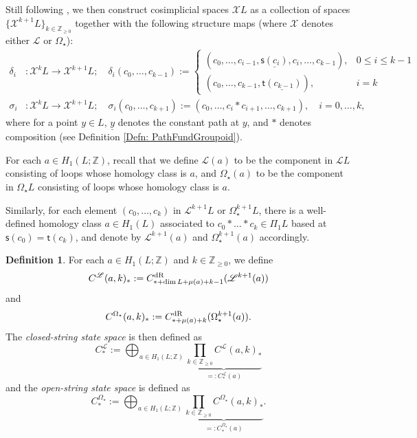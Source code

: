 \documentclass[10pt]{amsart}
\numberwithin{equation}{section}
\theoremstyle{plain}
\theoremstyle{definition}
\newtheorem{definition}[theorem]{Definition}
\theoremstyle{remark}
\numberwithin{equation}{section}
\newcommand{\Z}{\mathbb{Z}}
\newcommand{\mc}[1]{\mathcal{#1}}
\newcommand{\dR}{\textup{dR}}
\newcommand{\CFr}{C_*^\mathscr{L}}
\newcommand{\CBa}{C_*^{\Omega_\star}}
\begin{document}
{\bigskip

Still following \cite{WangThesis},
we then construct cosimplicial spaces $\mc{X}L$ as a collection of spaces $\{\mc{X}^{k+1} L\}_{k\in \Z_{\geq 0}}$ together with the following structure maps (where $\mathcal{X}$ denotes either $\mathscr{L}$ or $\Omega_\star$):
\begin{align*}
	\delta_i &\colon \mathcal{X}^{k}L\to \mathcal{X}^{k+1} L; \quad \delta_i(c_0,\dots, c_{k-1}):= \begin{cases}
		(c_0,\dots, c_{i-1},\underline{\textsf{s}(c_i)}, c_i,\dots, c_{k-1}), & 0 \leq i \leq k-1\\
		(c_0,\dots, c_{k-1}, \underline{\textsf{t}(c_{k-1})}), & i=k
	\end{cases}\\
	\sigma_i &\colon \mathcal{X}^{k}L\to \mathcal{X}^{k+1}L;\quad \sigma_i(c_0,\dots, c_{k+1}) := (c_0,\dots, c_i*c_{i+1},\dots, c_{k+1}), \quad i=0,\dots, k,
\end{align*}
where for a point $y\in L$, $\underline{y}$ denotes the constant path at $y$, and $*$ denotes composition (see Definition \ref{Defn: PathFundGroupoid}).


\bigskip

For each $a\in H_1(L;\Z)$, recall that we define $\mathscr{L}(a)$ to be the component in $\mathscr{L}L$ consisting of loops whose homology class is $a$, and $\Omega_\star(a)$ to be the component in $\Omega_\star L$ consisting of loops whose homology class is $a$. 

Similarly, for each element $(c_0,\dots, c_k)$ in $\mathscr{L}^{k+1} L$ or $\Omega_\star^{k+1} L$, there is a well-defined homology class $a\in H_1(L)$ associated to $c_0*\dots * c_k\in \Pi_1L$ based at $\textsf{s}(c_0)=\textsf{t}(c_k)$, and denote by $\mathscr{L}^{k+1}(a)$ and $\Omega^{k+1}_\star (a)$ accordingly.

\begin{definition}
For each $a\in H_1(L;\Z)$ and $k\in \Z_{\geq 0}$, we define
\begin{align*}
	C^\mathscr{L}(a,k)_*:= C^\dR_{*+\dim L + \mu(a) + k - 1}(\mathscr{L}^{k+1	}(a))
\end{align*}
and
\begin{align*}
	C^{\Omega_\star}(a,k)_*:= C^\dR_{*+\mu(a)+k}(\Omega_\star ^{k+1}(a)).
\end{align*}
The \emph{closed-string state space} is then defined as
\[ \CFr:= \bigoplus_{a\in H_1(L;\Z)} \underbrace{\prod_{k\in \Z_{\geq 0} } C^\mathscr{L}(a,k)_*}_{=: \CFr(a)}\]
and the \emph{open-string state space} is defined as
\[ \CBa:= \bigoplus_{a\in H_1(L;\Z)}\underbrace{\prod_{k\in \Z_{\geq 0} } C^{\Omega_\star}(a,k)_*}_{=: \CBa(a)}.\]
\end{definition}


}
\end{document}
